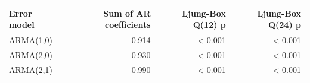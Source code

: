 
\begin{tabular}[t]{lrrr}
\toprule
Error model & Sum of AR coefficients & Ljung-Box Q(12) p & Ljung-Box Q(24) p\\
\midrule
ARMA(1,0) & 0.914 & < 0.001 & < 0.001\\
ARMA(2,0) & 0.930 & < 0.001 & < 0.001\\
ARMA(2,1) & 0.990 & < 0.001 & < 0.001\\
\bottomrule
\end{tabular}

